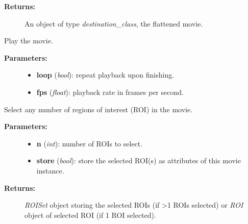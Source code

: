 \documentclass[letterpaper,10pt,english]{sphinxmanual}
\begin{document}
\begin{fulllineitems}
\begin{fulllineitems}
\begin{description}
\begin{itemize}
\end{itemize}

\item[{\textbf{Returns:}}] \leavevmode
An object of type \emph{destination\_class}, the flattened movie.

\end{description}

\end{fulllineitems}


\begin{fulllineitems}
\label{data_structures:movies.Movie.play}
Play the movie.
\begin{description}
\item[{\textbf{Parameters:}}] \leavevmode\begin{itemize}
\item {} 
\textbf{loop} (\emph{bool}): repeat playback upon finishing.

\item {} 
\textbf{fps} (\emph{float}): playback rate in frames per second.

\end{itemize}

\end{description}

\end{fulllineitems}


\begin{fulllineitems}
\label{data_structures:movies.Movie.select_roi}
Select any number of regions of interest (ROI) in the movie.
\begin{description}
\item[{\textbf{Parameters:}}] \leavevmode\begin{itemize}
\item {} 
\textbf{n} (\emph{int}): number of ROIs to select.

\item {} 
\textbf{store} (\emph{bool}): store the selected ROI(s) as attributes of this movie instance.

\end{itemize}

\item[{\textbf{Returns:}}] \leavevmode
\emph{ROISet} object storing the selected ROIs (if \textgreater{}1 ROIs selected)
or
\emph{ROI} object of selected ROI (if 1 ROI selected).


\end{description}
\end{fulllineitems}
\end{fulllineitems}
\end{document}
